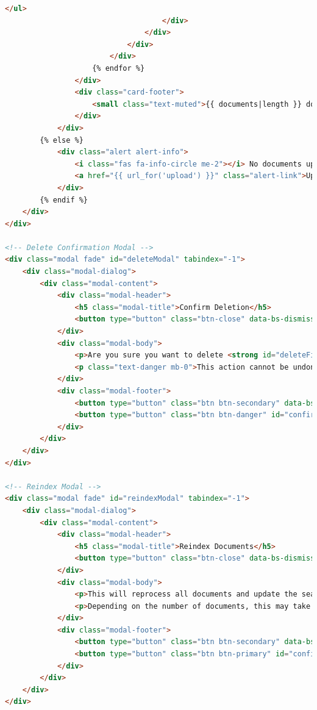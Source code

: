 \documentclass[
  screen,review,acmlarge]{acmart}
\begin{document}
\begin{lstlisting}[language=HTML]
                                        </ul>
                                    </div>
                                </div>
                            </div>
                        </div>
                    {% endfor %}
                </div>
                <div class="card-footer">
                    <small class="text-muted">{{ documents|length }} document(s)</small>
                </div>
            </div>
        {% else %}
            <div class="alert alert-info">
                <i class="fas fa-info-circle me-2"></i> No documents uploaded yet.
                <a href="{{ url_for('upload') }}" class="alert-link">Upload your first document</a>.
            </div>
        {% endif %}
    </div>
</div>

<!-- Delete Confirmation Modal -->
<div class="modal fade" id="deleteModal" tabindex="-1">
    <div class="modal-dialog">
        <div class="modal-content">
            <div class="modal-header">
                <h5 class="modal-title">Confirm Deletion</h5>
                <button type="button" class="btn-close" data-bs-dismiss="modal"></button>
            </div>
            <div class="modal-body">
                <p>Are you sure you want to delete <strong id="deleteFileName"></strong>?</p>
                <p class="text-danger mb-0">This action cannot be undone.</p>
            </div>
            <div class="modal-footer">
                <button type="button" class="btn btn-secondary" data-bs-dismiss="modal">Cancel</button>
                <button type="button" class="btn btn-danger" id="confirmDelete">Delete</button>
            </div>
        </div>
    </div>
</div>

<!-- Reindex Modal -->
<div class="modal fade" id="reindexModal" tabindex="-1">
    <div class="modal-dialog">
        <div class="modal-content">
            <div class="modal-header">
                <h5 class="modal-title">Reindex Documents</h5>
                <button type="button" class="btn-close" data-bs-dismiss="modal"></button>
            </div>
            <div class="modal-body">
                <p>This will reprocess all documents and update the search index.</p>
                <p>Depending on the number of documents, this may take some time.</p>
            </div>
            <div class="modal-footer">
                <button type="button" class="btn btn-secondary" data-bs-dismiss="modal">Cancel</button>
                <button type="button" class="btn btn-primary" id="confirmReindex">Reindex</button>
            </div>
        </div>
    </div>
</div>


\end{lstlisting}
\end{document}
